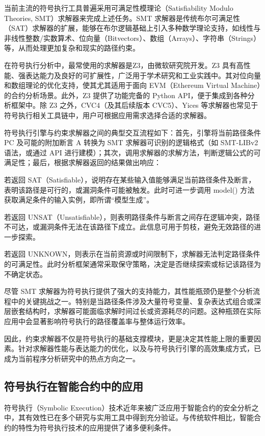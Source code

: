 \documentclass[print, master, vlined, timesmath]{DissertUESTC}
\begin{document}
当前主流的符号执行工具普遍采用可满足性模理论（Satisfiability Modulo Theories, SMT）求解器来完成上述任务\cite{}。SMT 求解器是传统布尔可满足性（SAT）求解器的扩展，能够在布尔逻辑基础上引入多种数学理论支持，如线性与非线性整数/实数算术、位向量（Bitvectors）、数组（Arrays）、字符串（Strings）等，从而处理更加复杂和现实的路径约束。

在符号执行分析中，最常使用的求解器是Z3\cite{}，由微软研究院开发。Z3 具有高性能、强表达能力及良好的可扩展性，广泛用于学术研究和工业实践中。其对位向量和数组理论的优化支持，使其尤其适用于面向 EVM（Ethereum Virtual Machine）的合约分析场景。此外，Z3 提供了功能完备的 Python API，便于集成到各种分析框架中。除 Z3 之外，CVC4（及其后续版本 CVC5）\cite{}、Yices\cite{} 等求解器也常见于符号执行相关工具链中，用户可根据应用需求选择合适的求解器。

符号执行引擎与约束求解器之间的典型交互流程如下：首先，引擎将当前路径条件 PC 及可能的附加断言 A 转换为 SMT 求解器可识别的逻辑格式（如 SMT-LIBv2 语法\cite{}，或通过 API 进行建模）；其次，调用求解器的求解方法，判断逻辑公式的可满足性；最后，根据求解器返回的结果做出响应：

若返回 SAT（Satisfiable），说明存在某些输入值能够满足当前路径条件及断言，表明该路径是可行的，或漏洞条件可能被触发。此时可进一步调用 model() 方法获取满足条件的输入实例，即所谓“模型生成”。

若返回 UNSAT（Unsatisfiable），则表明路径条件与断言之间存在逻辑冲突，路径不可达，或漏洞条件无法在该路径下成立。此信息可用于剪枝，避免无效路径的进一步探索。

若返回 UNKNOWN，则表示在当前资源或时间限制下，求解器无法判定路径条件的可满足性。此时分析框架通常采取保守策略，决定是否继续探索或标记该路径为不确定状态。

尽管 SMT 求解器为符号执行提供了强大的支持能力，其性能瓶颈仍是整个分析流程中的关键挑战之一\cite{}。特别是当路径条件涉及大量符号变量、复杂表达式组合或深层嵌套结构时，求解器可能面临求解时间过长或资源耗尽的问题。这种瓶颈在实际应用中会显著影响符号执行的路径覆盖率与整体运行效率。

因此，约束求解器不仅是符号执行的基础支撑模块，更是决定其性能上限的重要因素。针对求解器性能与表达能力的优化，以及与符号执行引擎的高效集成方式，已成为当前程序分析研究中的热点方向之一\cite{}。

\subsection{符号执行在智能合约中的应用}

符号执行（Symbolic Execution）技术近年来被广泛应用于智能合约的安全分析之中，其有效性已在多个研究与实用工具中得到充分验证\cite{}。与传统软件相比，智能合约的特性为符号执行技术的应用提供了诸多便利条件。
\end{document}
